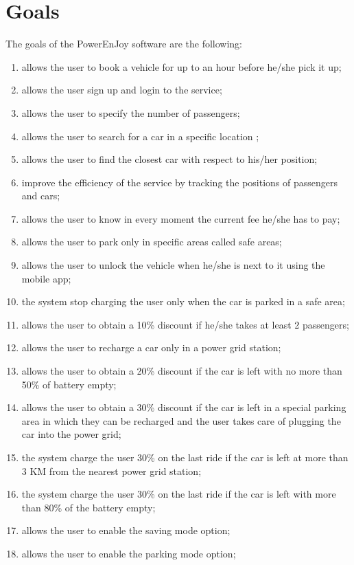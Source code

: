 \section{Goals}
The goals of the PowerEnJoy software are the following:
\begin{enumerate}
	\item allows the user to book a vehicle for up to an hour before he/she pick it up;
	\item allows the user sign up and login to the service;  
	\item allows the user to specify the number of passengers;
	\item allows the user to search for a car in a specific location ; 
	\item allows the user to find the closest car with respect to his/her position; 
	\item improve the efficiency of the service by tracking the positions of passengers and cars; 
	\item allows the user to know in every moment the current fee he/she has to pay;
	\item allows the user to park only in specific areas called safe areas;
	\item allows the user to unlock the vehicle when he/she is next to it using the mobile app;
	\item the system stop charging the user only when the car is parked in a safe area;
	\item allows the user to obtain a 10\% discount if he/she takes at least 2 passengers;
	\item allows the user to recharge a car only in a power grid station;
	\item allows the user to obtain a 20\% discount if the car is left with no more than 50\% of battery empty;
	\item allows the user to obtain a 30\% discount if the car is left in a special parking area in which they can be recharged and the user takes care of plugging the car into the power grid;
	\item the system charge the user 30\% on the last ride if the car is left at more than 3 KM from the nearest power grid station;
	\item the system charge the user 30\% on the last ride if the car is left with more than 80\% of the battery empty;
	\item allows the user to enable the saving mode option;
	\item allows the user to enable the parking mode option;
	
	
\end{enumerate}